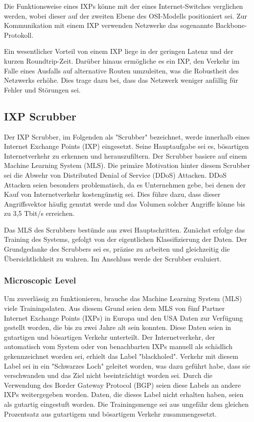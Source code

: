 \documentclass[sigplan,screen]{acmart}
\begin{document}
Die Funktionsweise eines IXPs könne mit der eines Internet-Switches verglichen werden, wobei dieser auf der zweiten Ebene des OSI-Modells positioniert sei. Zur Kommunikation mit einem IXP verwenden Netzwerke das sogenannte Backbone-Protokoll.

Ein wesentlicher Vorteil von einem IXP liege in der geringen Latenz und der kurzen Roundtrip-Zeit. Darüber hinaus ermögliche es ein IXP, den Verkehr im Falle eines Ausfalls auf alternative Routen umzuleiten, was die Robustheit des Netzwerks erhöhe. Dies trage dazu bei, dass das Netzwerk weniger anfällig für Fehler und Störungen sei. \cite{ixp00}

\subsection{IXP Scrubber}
Der IXP Scrubber, im Folgenden als "Scrubber" bezeichnet, werde innerhalb eines Internet Exchange Points (IXP) eingesetzt. Seine Hauptaufgabe sei es, bösartigen Internetverkehr zu erkennen und herauszufiltern. Der Scrubber basiere auf einem Machine Learning System (MLS). Die primäre Motivation hinter diesem Scrubber sei die Abwehr von Distributed Denial of Service (DDoS) Attacken. DDoS Attacken seien besonders problematisch, da es Unternehmen gebe, bei denen der Kauf von Internetverkehr kostengünstig sei. Dies führe dazu, dass dieser Angriffsvektor häufig genutzt werde und das Volumen solcher Angriffe könne bis zu 3,5 Tbit/s erreichen.

Das MLS des Scrubbers bestünde aus zwei Hauptschritten. Zunächst erfolge das Training des Systems, gefolgt von der eigentlichen Klassifizierung der Daten. Der Grundgedanke des Scrubbers sei es, präzise zu arbeiten und gleichzeitig die Übersichtlichkeit zu wahren. Im Anschluss werde der Scrubber evaluiert.

\subsubsection{Microscopic Level}
Um zuverlässig zu funktionieren, brauche das Machine Learning System (MLS) viele Trainingsdaten. Aus diesem Grund seien dem MLS von fünf Partner Internet Exchange Points (IXPs) in Europa und den USA Daten zur Verfügung gestellt worden, die bis zu zwei Jahre alt sein konnten. Diese Daten seien in gutartigen und bösartigen Verkehr unterteilt. Der Internetverkehr, der automatisch vom System oder von benachbarten IXPs manuell als schädlich gekennzeichnet worden sei, erhielt das Label "blackholed". Verkehr mit diesem Label sei in ein "Schwarzes Loch" geleitet worden, was dazu geführt habe, dass sie verschwanden und das Ziel nicht beeinträchtigt worden sei. Durch die Verwendung des Border Gateway Protocol (BGP) seien diese Labels an andere IXPs weitergegeben worden. \cite{blackhole00}
Daten, die dieses Label nicht erhalten haben, seien als gutartig eingestuft worden. Die Trainingsmenge sei aus ungefähr dem gleichen Prozentsatz aus gutartigem und bösartigem Verkehr zusammengesetzt.
\end{document}
